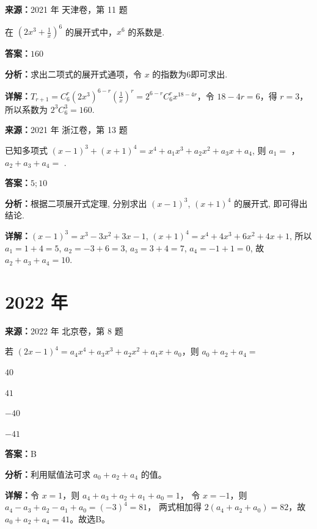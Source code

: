 \begin{question}[points=5]
\textbf{来源：}2021 年 天津卷，第 11 题\par
在 $\left(2x^3 + \frac{1}{x}\right)^6$ 的展开式中，$x^6$ 的系数是.
\fillin[{$160$}]
\begin{solution}
\textbf{答案：}$160$

\textbf{分析：}求出二项式的展开式通项，令 $x$ 的指数为6即可求出.

\textbf{详解：}$T_{r+1} = C_6^r (2x^3)^{6-r} \left(\frac{1}{x}\right)^r = 2^{6-r} C_6^r x^{18-4r}$，令 $18-4r=6$，得 $r=3$，所以系数为 $2^3 C_6^3 = 160$.
\end{solution}
\end{question}

\begin{question}[points=6]
\textbf{来源：}2021 年 浙江卷，第 13 题\par
已知多项式 $(x-1)^3 + (x+1)^4 = x^4 + a_1 x^3 + a_2 x^2 + a_3 x + a_4$, 则 $a_1 =$ ，$a_2+a_3+a_4 =$ .
\fillin[{$5; 10$}]
\begin{solution}
\textbf{答案：}$5; 10$

\textbf{分析：}根据二项展开式定理, 分别求出 $(x-1)^3$, $(x+1)^4$ 的展开式, 即可得出结论.

\textbf{详解：}$(x-1)^3 = x^3-3x^2+3x-1$, $(x+1)^4 = x^4+4x^3+6x^2+4x+1$, 所以 $a_1=1+4=5$, $a_2=-3+6=3$, $a_3=3+4=7$, $a_4=-1+1=0$, 故 $a_2+a_3+a_4=10$.
\end{solution}
\end{question}

\section*{2022 年}

\begin{question}[points=4]
\textbf{来源：}2022 年 北京卷，第 8 题\par
若 $(2x-1)^4 = a_4 x^4 + a_3 x^3 + a_2 x^2 + a_1 x + a_0$，则 $a_0 + a_2 + a_4 =$
\begin{choices}
  \item $40$
  \item $41$
  \item $-40$
  \item $-41$
\end{choices}
\begin{solution}
\textbf{答案：}B

\textbf{分析：}利用赋值法可求 $a_0 + a_2 + a_4$ 的值。

\textbf{详解：}令 $x = 1$，则 $a_4 + a_3 + a_2 + a_1 + a_0 = 1$，
令 $x = -1$，则 $a_4 - a_3 + a_2 - a_1 + a_0 = (-3)^4 = 81$，
两式相加得 $2(a_4 + a_2 + a_0) = 82$，故 $a_0 + a_2 + a_4 = 41$。故选B。
\end{solution}
\end{question}

